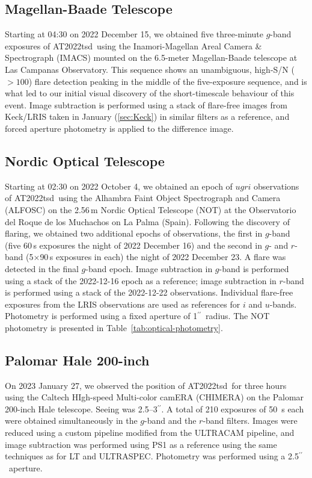 \documentclass{nature_plusfigure}
\newcommand{\at}{AT2022tsd}
\newcommand{\arcsec}{$^{\prime\prime}$}
\begin{document}
\begin{methods}
\subsection{Magellan-Baade Telescope}
\label{sec:magellan}

Starting at 04:30 on 2022 December 15, we obtained five three-minute $g$-band exposures of \at\ using the Inamori-Magellan Areal Camera \& Spectrograph (IMACS\cite{Dressler2011}) mounted on the 6.5-meter Magellan-Baade telescope at Las Campanas Observatory.  This sequence shows an unambiguous, high-S/N ($>100$) flare detection peaking in the middle of the five-exposure sequence, and is what led to our initial visual discovery of the short-timescale behaviour of this event.  Image subtraction is performed using a stack of flare-free images from Keck/LRIS taken in January (\ref{sec:Keck}) in similar filters as a reference, and forced aperture photometry is applied to the difference image.

\subsection{Nordic Optical Telescope}
\label{sec:not}

Starting at 02:30 on 2022 October 4, we obtained an epoch of $ugri$ observations of \at\ using the Alhambra Faint Object Spectrograph and Camera (ALFOSC) on the 2.56\,m Nordic Optical Telescope (NOT) at the Observatorio del Roque de los Muchachos on La Palma (Spain). Following the discovery of flaring, we obtained two additional epochs of observations, the first in $g$-band (five 60\,s exposures the night of 2022 December 16) and the second in $g$- and $r$-band (5$\times$90\,s exposures in each) the night of 2022 December 23. A flare was detected in the final $g$-band epoch.  Image subtraction in $g$-band is performed using a stack of the 2022-12-16 epoch as a reference; image subtraction in $r$-band is performed using a stack of the 2022-12-22 observations.  Individual flare-free exposures from the LRIS observations are used as references for $i$ and $u$-bands.  Photometry is performed using a fixed aperture of 1\arcsec\ radius.
The NOT photometry is presented in Table~\ref{tab:optical-photometry}.


\subsection{Palomar Hale 200-inch}
\label{sec:chimera}

On 2023 January 27, we observed the position of \at\ for three hours using the Caltech HIgh-speed Multi-color camERA (CHIMERA\cite{Harding2016}) on the Palomar 200-inch Hale telescope. Seeing was 2.5--3\arcsec.
A total of 210 exposures of 50~s each were obtained simultaneously in the $g$-band and the $r$-band filters. Images were reduced using a custom pipeline modified from the ULTRACAM pipeline\cite{Dhillon2007}, and image subtraction was performed using PS1 as a reference using the same techniques as for LT and ULTRASPEC. Photometry was performed using a 2.5\arcsec\ aperture.


\end{methods}
\end{document}
